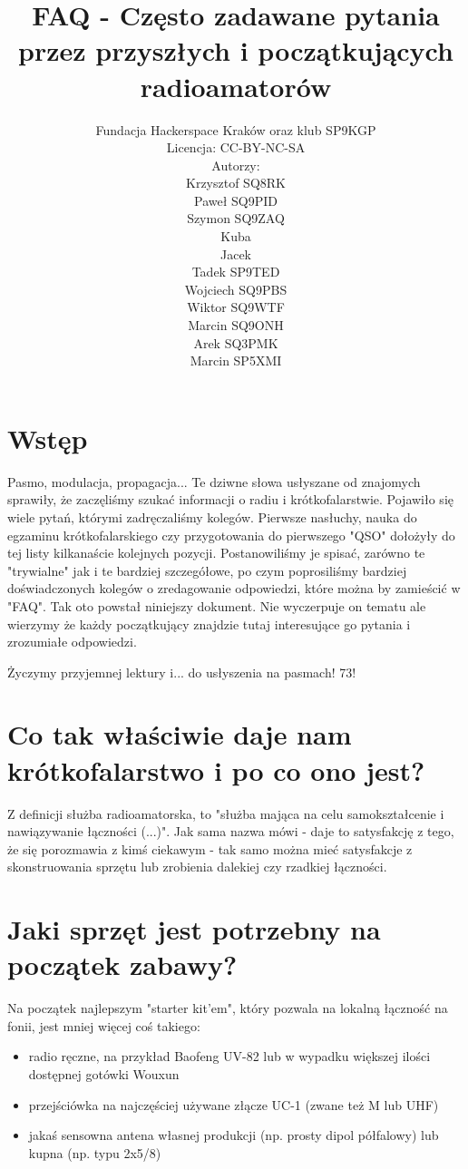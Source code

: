 \documentclass[a4paper,12pt]{article}
\title{\textbf{FAQ - Często zadawane pytania przez przyszłych i początkujących radioamatorów}}
\author{Fundacja Hackerspace Kraków
oraz klub SP9KGP\\
Licencja: CC-BY-NC-SA\\
\vspace{1ex}
Autorzy:\\
Krzysztof SQ8RK\\
Paweł SQ9PID\\
Szymon SQ9ZAQ\\
Kuba\\
Jacek\\
Tadek SP9TED\\
Wojciech SQ9PBS\\
Wiktor SQ9WTF\\
Marcin SQ9ONH\\
Arek SQ3PMK\\
Marcin SP5XMI}
\begin{document}
\maketitle

\newpage
\newpage

\section{Wstęp}
Pasmo, modulacja, propagacja... Te dziwne słowa usłyszane od znajomych sprawiły, że zaczęliśmy szukać informacji o radiu i krótkofalarstwie. Pojawiło się wiele pytań, którymi zadręczaliśmy kolegów. Pierwsze nasłuchy, nauka do egzaminu krótkofalarskiego czy przygotowania do pierwszego "QSO" dołożyły do tej listy kilkanaście kolejnych pozycji. Postanowiliśmy je spisać, zarówno te "trywialne" jak i te bardziej szczegółowe, po czym poprosiliśmy bardziej doświadczonych kolegów o zredagowanie odpowiedzi, które można by zamieścić w "FAQ". Tak oto powstał niniejszy dokument. Nie wyczerpuje on tematu ale wierzymy że każdy początkujący znajdzie tutaj interesujące go pytania i zrozumiałe odpowiedzi. 

Życzymy przyjemnej lektury i... do usłyszenia na pasmach! 73!

\section{Co tak właściwie daje nam krótkofalarstwo i po co ono jest?}
Z definicji służba radioamatorska, to "służba mająca na celu samokształcenie i nawiązywanie łączności (...)". Jak sama nazwa mówi - daje to satysfakcję z tego, że się porozmawia z kimś ciekawym - tak samo można mieć satysfakcje z skonstruowania sprzętu lub zrobienia dalekiej czy rzadkiej łączności.

\section{Jaki sprzęt jest potrzebny na początek zabawy?}
Na początek najlepszym "starter kit'em", który pozwala na lokalną łączność na fonii, jest mniej więcej coś takiego:
\begin{itemize}
 \item radio ręczne, na przykład Baofeng UV-82 lub w wypadku większej ilości dostępnej gotówki Wouxun
 \item przejściówka na najczęściej używane złącze UC-1 (zwane też M lub UHF)
 \item jakaś sensowna antena własnej produkcji (np. prosty dipol półfalowy) lub kupna (np. typu 2x5/8)
\end{itemize}
\end{document}
